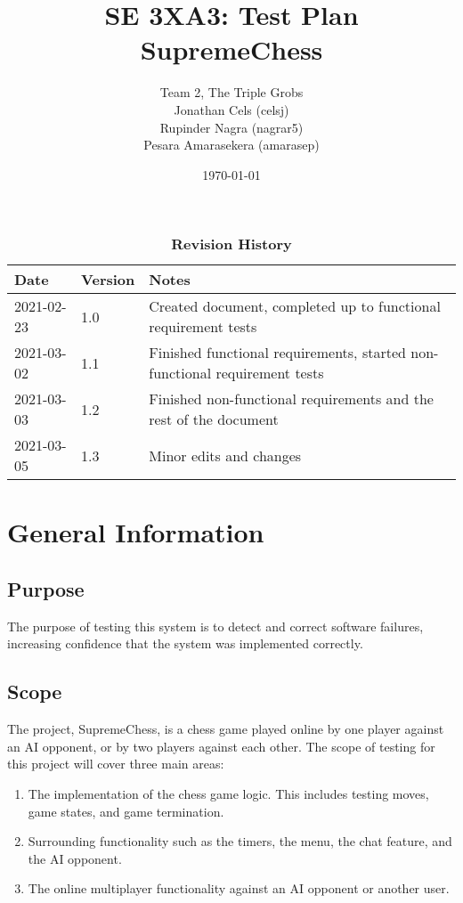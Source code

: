 \documentclass[12pt, titlepage]{article}
\title{SE 3XA3: Test Plan\\SupremeChess}
\author{Team 2, The Triple Grobs
        \\ Jonathan Cels (celsj)
        \\ Rupinder Nagra (nagrar5)
		\\ Pesara Amarasekera (amarasep)
}
\date{\today}
\begin{document}
\maketitle

\tableofcontents
\listoftables

\begin{table}[bp]
\caption{\bf Revision History}
\begin{tabularx}{\textwidth}{p{3cm}p{2cm}X}
\toprule {\bf Date} & {\bf Version} & {\bf Notes}\\
\midrule
2021-02-23 & 1.0 & Created document, completed up to functional requirement tests\\
2021-03-02 & 1.1 & Finished functional requirements, started non-functional requirement tests\\
2021-03-03 & 1.2 & Finished non-functional requirements and the rest of the document\\
2021-03-05 & 1.3 & Minor edits and changes\\
\bottomrule
\end{tabularx}
\end{table}

\newpage


\section{General Information}

\subsection{Purpose}

The purpose of testing this system is to detect and correct software failures, increasing confidence that the system was implemented correctly.

\subsection{Scope}

The project, SupremeChess, is a chess game played online by one player against an AI opponent, or by two players against each other. The scope of testing for this project will cover three main areas:

\begin{enumerate}
    \item The implementation of the chess game logic. This includes testing moves, game states, and game termination.
    \item Surrounding functionality such as the timers, the menu, the chat feature, and the AI opponent.
    \item The online multiplayer functionality against an AI opponent or another user.
\end{enumerate}
\end{document}
